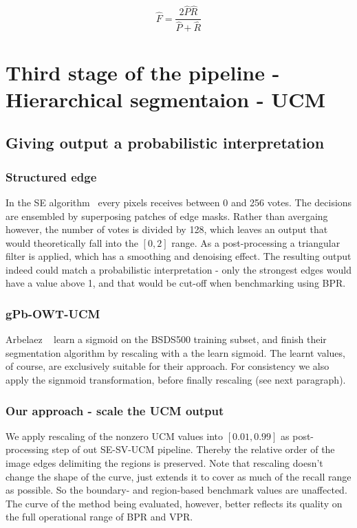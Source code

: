 \[
\hat{{F}}=\frac{2\hat{P}\hat{R}}{\hat{P}+\hat{R}}
\]

\section{Third stage of the pipeline - Hierarchical segmentaion - UCM}

\subsection{Giving output a probabilistic interpretation}

\subsubsection*{Structured edge}
In the SE algorithm~\cite{DollarICCV13edges,Dollar2014fast} every pixels receives between 0 and 256 votes. The decisions are ensembled by superposing patches of edge masks. Rather than avergaing however, the number of votes is divided by 128, which leaves an output that would theoretically fall into the $[0, 2]$ range. As a post-processing a triangular filter is applied, which has a smoothing and denoising effect. The resulting output indeed could match a probabilistic interpretation - only the strongest edges would have a value above 1, and that would be cut-off when benchmarking using BPR.

\subsubsection*{gPb-OWT-UCM}
Arbelaez \etal~\cite{Arbelaez11} learn a sigmoid on the BSDS500 training subset, and finish their segmentation algorithm by rescaling with a the learn sigmoid. The learnt values, of course, are exclusively suitable for their approach. For consistency we also apply the signmoid transformation, before finally rescaling (see next paragraph).

\subsubsection*{Our approach - scale the UCM output} %
We apply rescaling of the nonzero UCM values into $[0.01, 0.99]$ as post-processing step of out SE-SV-UCM pipeline. Thereby the relative order of the image edges delimiting the regions is preserved. Note that rescaling doesn't change the shape of the curve, just extends it to cover as much of the recall range as possible. So the boundary- and region-based benchmark values are unaffected. The curve of the method being evaluated, however, better reflects its quality on the full operational range of BPR and VPR.

